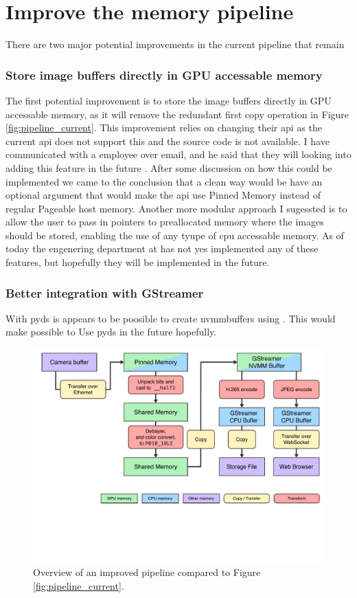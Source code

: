 \section{Improve the memory pipeline}
\label{sec:memory_pipeline_improvements}

There are two major potential improvements in the current pipeline that remain

\subsubsection{Store image buffers directly in GPU accessable memory}
The first potential improvement is to store the image buffers directly in GPU accessable memory, as it will remove the redundant first copy operation in Figure \ref{fig:pipeline_current}.
This improvement relies on \lucid changing their \gls{api} as the current \gls{api} does not support this and the source code is not available.
I have communicated with a \lucid employee over email, and he said that they will looking into adding this feature in the future \cite{martensRe17896Use2023}.
After some discussion on how this could be implemented we came to the conclusion that a clean way would be have an optional argument that would make the \gls{api} use Pinned Memory instead of regular Pageable host memory.
Another more modular approach I sugessted is to allow the user to pass in pointers to preallocated memory where the images should be stored, enabling the use of any tyupe of \gls{cpu} accessable memory.
As of today the engenering department at \lucid has not yes implemented any of these features, but hopefully they will be implemented in the future.

\subsubsection{Better integration with GStreamer}
With \gls{pyds} is appears to be poosible to create \glspl{nvmmbuffer} using  \cite{nvidiaNvBufSurfaceCreateDeepstreamDeepstream2023}\cite{babukrCreatingGstBuffersUsing2021}.
This would make possible to
Use \gls{pyds} in the future hopefully.

\begin{figure}[H]
    \centering
    \includegraphics[width=\textwidth]{figures/memory_pipeline/optimal.pdf}
    \caption{Overview of an improved pipeline compared to Figure \ref{fig:pipeline_current}.}
    \label{fig:pipeline_optimal}
\end{figure}